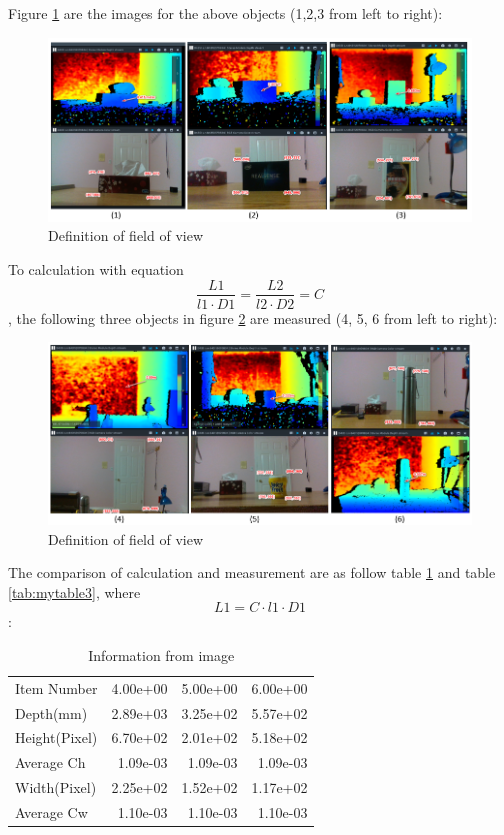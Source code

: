 \documentclass[
  oneside]{ubcthesis}
\begin{document}
Figure \ref{fig:figure6} are the images for the above objects (1,2,3 from left to right):

\begin{figure}

{\centering \includegraphics[width=0.9\linewidth]{figures/6} 

}

\caption{Definition of field of view}\label{fig:figure6}
\end{figure}



To calculation with equation \[\frac{L1}{l1 \cdot D1} = \frac{L2}{l2 \cdot D2} = C\], the following three objects in figure \ref{fig:figure7} are measured (4, 5, 6 from left to right):

\begin{figure}

{\centering \includegraphics[width=0.9\linewidth]{figures/7} 

}

\caption{Definition of field of view}\label{fig:figure7}
\end{figure}



The comparison of calculation and measurement are as follow table \ref{tab:mytable2} and table \ref{tab:mytable3}, where \[L1 = C \cdot l1 \cdot D1\]:

\begin{table}

\caption{\label{tab:mytable2}Information from image}
\centering
\begin{tabular}[t]{lrrr}
\toprule
Item Number & 4.00e+00 & 5.00e+00 & 6.00e+00\\
Depth(mm) & 2.89e+03 & 3.25e+02 & 5.57e+02\\
Height(Pixel) & 6.70e+02 & 2.01e+02 & 5.18e+02\\
Average Ch & 1.09e-03 & 1.09e-03 & 1.09e-03\\
Width(Pixel) & 2.25e+02 & 1.52e+02 & 1.17e+02\\
\addlinespace
Average Cw & 1.10e-03 & 1.10e-03 & 1.10e-03\\
\bottomrule
\end{tabular}
\end{table}
\end{document}
